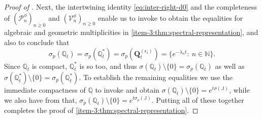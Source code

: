 \documentclass[JEP,XML,SOM,Unicode]{cedram}
\theoremstyle{plain}
\theoremstyle{definition}
\newcommand{\N}{\mathbb{N}}
\renewcommand{\P}{\mathcal{P}}
\newcommand{\V}{\mathcal{V}}
\newcommand{\J}{\mathds{Q}}
\newcommand{\calJ}{\mathds{J}}
\newcommand{\vat}{{\mathsf{r}_1}}
\newcommand{\Q}[1][\mo]{\mathbf{Q}^{({#1})}}
\let\mo\mu
\begin{document}
\begin{proof}[Proof of ]
Next, the intertwining identity \eqref{eq:inter-right-d0} and the completeness of $(\P_n^\phi)_{n \geq 0}$ and $(\V_n^\phi)_{n \geq 0}$ enable us to invoke \cite[Prop.\,11.4]{Patie-Savov-GeL} to obtain the equalities for algebraic and geometric multiplicities in \eqref{item-3:thm:spectral-representation}, and also to conclude that
\begin{equation*}
\sigma_p(\J_t) = \sigma_p(\J_t^*) = \sigma_p(\Q[\vat]_t) = \{e^{-\lambda_n t} : \ n \in \N\}.
\end{equation*}
Since $\J_t$ is compact, $\J_t^*$ is so too, and thus $\sigma(\J_t) \setminus \{0\} = \sigma_p(\J_t)$ as well as
$\sigma(\J_t^*) \setminus \{0\} = \sigma_p(\J_t^*)$. To establish the remaining equalities we use the immediate compactness of $\J$ to invoke \cite[Cor.\,3.12]{EngelNagel} and obtain $\sigma(\J_t) \setminus \{0\} = e^{t\sigma(\calJ)}$, while we also have from \cite[Th.\,3.7]{EngelNagel} that, $\sigma_p(\J_t) \setminus \{0\} = e^{t\sigma_p(\calJ)}$. Putting all of these together completes the proof of \eqref{item-3:thm:spectral-representation}.


\end{proof}
\end{document}
